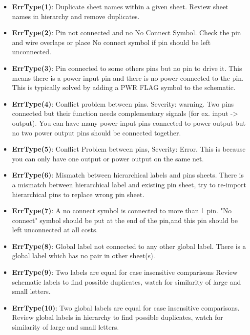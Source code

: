 \begin {itemize}

\item{\textbf{ErrType(1)}}: Duplicate sheet names within a given sheet.
Review sheet names in hierarchy and remove duplicates. 

\item{\textbf{ErrType(2)}}: Pin not connected and no No Connect Symbol.
Check the pin and wire overlaps or place No connect symbol if pin should be left unconnected.
 
\item{\textbf{ErrType(3)}}: Pin connected to some others pins but no pin to drive it.
This means there is a power input pin and there is no power connected to the pin. This is typically solved by adding a PWR FLAG symbol to the schematic.
 
\item{\textbf{ErrType(4)}}: Conflict problem between pins. Severity: warning.
Two pins connected but their function needs complementary signals (for ex. input -> output). You can have many power input pins connected to power output but no two power output pins should be connected together.

\item{\textbf{ErrType(5)}}: Conflict Problem between pins, Severity: Error. 
This is because you can only have one output or power output on the same net. 

\item{\textbf{ErrType(6)}}: Mismatch between hierarchical labels and pins sheets. 
There is a mismatch between hierarchical label and existing pin sheet, try to re-import hierarchical pins to replace wrong pin sheet. 

\item{\textbf{ErrType(7)}}: A no connect symbol is connected to more than 1 pin. 
"No connect" symbol should be put at the end of the pin,and this pin should be left unconnected at all costs.

\item{\textbf{ErrType(8)}}: Global label not connected to any other global label. 
There is a global label which has no pair in other sheet(s). 

\item{\textbf{ErrType(9)}}: Two labels are equal for case insensitive comparisons 
Review schematic labels to find possible duplicates, watch for similarity of large and small letters. 

\item{\textbf{ErrType(10)}}: Two global labels are equal for case insensitive comparisons. 
Review global labels in hierarchy to find possible duplicates, watch for similarity of large and small letters.

\end {itemize}
\pagebreak

